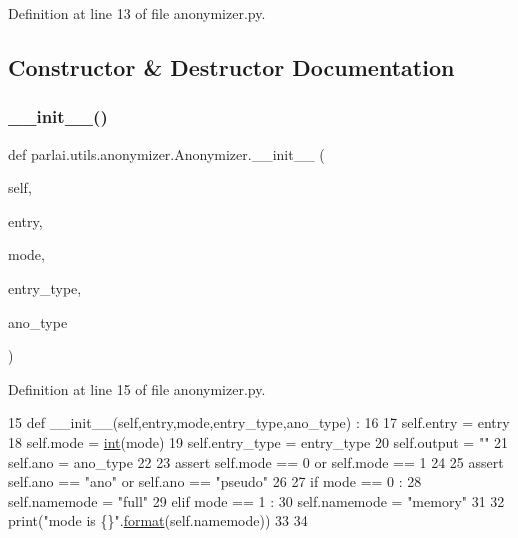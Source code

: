 Definition at line 13 of file anonymizer.\+py.



\subsection{Constructor \& Destructor Documentation}
\mbox{\label{classparlai_1_1utils_1_1anonymizer_1_1Anonymizer_abb5227ee9a889aff79a0c657c76ffd71}} 
\subsubsection{\texorpdfstring{\+\_\+\+\_\+init\+\_\+\+\_\+()}{\_\_init\_\_()}}
{\footnotesize\ttfamily def parlai.\+utils.\+anonymizer.\+Anonymizer.\+\_\+\+\_\+init\+\_\+\+\_\+ (\begin{DoxyParamCaption}\item[{}]{self,  }\item[{}]{entry,  }\item[{}]{mode,  }\item[{}]{entry\+\_\+type,  }\item[{}]{ano\+\_\+type }\end{DoxyParamCaption})}



Definition at line 15 of file anonymizer.\+py.


\begin{DoxyCode}
15     \textcolor{keyword}{def }\_\_init\_\_(self,entry,mode,entry\_type,ano\_type) : 
16 
17         self.entry = entry
18         self.mode = \hyperlink{namespacelanguage__model_1_1eval__ppl_a7d12ee00479673c5c8d1f6d01faa272a}{int}(mode)
19         self.entry\_type = entry\_type
20         self.output = \textcolor{stringliteral}{""}
21         self.ano = ano\_type
22 
23         \textcolor{keyword}{assert} self.mode == 0 \textcolor{keywordflow}{or} self.mode == 1
24 
25         \textcolor{keyword}{assert} self.ano == \textcolor{stringliteral}{"ano"} \textcolor{keywordflow}{or} self.ano == \textcolor{stringliteral}{"pseudo"} 
26 
27         \textcolor{keywordflow}{if} mode == 0 : 
28             self.namemode = \textcolor{stringliteral}{"full"}
29         \textcolor{keywordflow}{elif} mode == 1 : 
30             self.namemode = \textcolor{stringliteral}{"memory"}
31 
32         print(\textcolor{stringliteral}{"mode is \{\}"}.\hyperlink{namespaceparlai_1_1chat__service_1_1services_1_1messenger_1_1shared__utils_a32e2e2022b824fbaf80c747160b52a76}{format}(self.namemode)) 
33 
34 
\end{DoxyCode}


